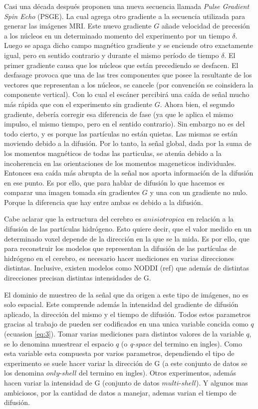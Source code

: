 \documentclass[11pt,a4paper,twoside]{tesis}
\begin{document}
Casi una d\'ecada despu\'es \citet{Stejskal1965} proponen una nueva secuencia 
llamada \textit{Pulse Gradient Spin Echo} (PSGE). La cual agrega otro
gradiente a la secuencia utilizada para generar las imágenes MRI. Este nuevo 
gradiente $G$ a\~nade velocidad de precesi\'on a los n\'ucleos en un 
determinado momento del experimento por un tiempo $\delta$. Luego se apaga dicho 
campo magn\'etico gradiente y se enciende otro exactamente igual, pero en 
sentido contrario y durante el mismo per\'iodo de tiempo $\delta$. El primer 
gradiente causa que los n\'ucleos que est\'an precediendo se desfacen. 
El desfasage provoca que una de las tres componentes que posee la resultante de los vectores que 
representan a los n\'ucleos, se cancele (por convenci\'on se coinsidera la componente vertical). Con 
lo cual el escáner percibir\'a una ca\'ida de se\~nal mucho m\'as r\'apida que con el experimento 
sin gradiente $G$. Ahora bien, el segundo gradiente, debería  corregir esa diferencia de fase (ya 
que le aplica el mismo impulso, el mismo tiempo, pero en el sentido contrario). Sin embargo no es 
del todo cierto, y es porque las part\'iculas no est\'an quietas. Las mismas se est\'an moviendo 
debido a la difusi\'on. Por lo tanto, la señal global, dada por la suma de los momentos magnéticos 
de todas las particulas, se atenúa debido a la incoherencia en las orientaciones de los momentos mageneticos
individuales. Entonces esa caída más abrupta de la señal nos 
aporta informaci\'on de la difusión en ese punto. Es por ello, que para 
hablar de difusi\'on lo que hacemos es comparar una 
imagen tomada sin gradientes $G$ y una con un gradiente no nulo. Porque la 
diferencia que hay entre ambas es debido a la difusi\'on.



Cabe aclarar que la estructura del cerebro es $anisiotropica$ en relación 
a la difusión de las part\'iculas hidrógeno. Esto quiere decir, que el valor 
medido en un determinado voxel depende de la direcci\'on en la que se la mida. 
Es por ello, que para reconstruir los modelos que 
representan la difusi\'on de las partículas de hidrógeno en el cerebro, es 
necesario hacer mediciones en varias direcciones distintas. Inclusive, existen 
modelos como NODDI (ref) que adem\'as de distintas direcciones precisan 
distintas intensidades de G. 

El dominio de muestreo de la señal que da origen a este tipo de imágenes, no es solo 
espacial. Este comprende además la intensidad del gradiente de difusión aplicado, la dirección del mismo y el 
tiempo de difusión. Todos estos parametros gracias al trabajo de \citet{CALLAGHAN1990177} pueden ser codificados en una unica variable 
concida como $q$ (ecuasion \ref{eq:3}). Tomar varias mediciones para distintos valores de la variable $q$, se lo denomina 
muestrear el espacio $q$ (o \textit{q-space} del termino en ingles). Como esta variable esta compuesta por varios parametros, dependiendo el tipo de experimento se 
suele hacer variar la dirección de G (a este conjunto de datos se los denomina $only$-$shell$ del termino en ingles). Otros experimentos,
además hacen variar la intensidad de G (conjunto de datos $multi$-$shell$). Y algunos mas ambiciosos, por la cantidad de datos a manejar, 
ademas varian el tiempo de difusión.
\end{document}

